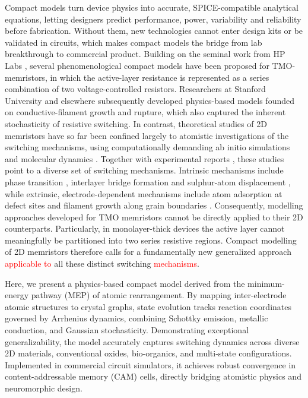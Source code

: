 \documentclass[aip,apl,reprint,floatfix]{revtex4-2}
\newcommand{\changed}[1]{\textcolor{red}{#1}}
\begin{document}
Compact models turn device physics into accurate, SPICE-compatible analytical equations, letting designers predict performance, power, variability and reliability before fabrication. Without them, new technologies cannot enter design kits or be validated in circuits, which makes compact models the bridge from lab breakthrough to commercial product. Building on the seminal work from HP Labs \cite{Strukov2008}, several phenomenological compact models \cite{Pickett2009Switching,Kvatinsky2013TEAM} have been proposed for TMO-memristors, in which the active-layer resistance is represented as a series combination of two voltage-controlled resistors. Researchers at Stanford University \cite{Jiang} and elsewhere \cite{Yu,Guan2012,Huang2013,Li2014} subsequently developed physics-based models founded on conductive-filament growth and rupture, which also captured the inherent stochasticity of resistive switching. In contrast, theoretical studies of 2D memristors have so far been confined largely to atomistic investigations of the switching mechanisms, using computationally demanding ab initio simulations and molecular dynamics \cite{Mitra2024Atomistic}. Together with experimental reports \cite{atomrister,zhang2019electric}, these studies point to a diverse set of switching mechanisms. Intrinsic mechanisms include phase transition \cite{zhang2019electric}, interlayer bridge formation \cite{Ducry2022} and sulphur-atom displacement \cite{Mitra2021}, while extrinsic, electrode-dependent mechanisms include atom adsorption at defect sites \cite{Hus2021,Ge2018} and filament growth along grain boundaries \cite{Sangwan2015}. Consequently, modelling approaches developed for TMO memristors cannot be directly applied to their 2D counterparts. Particularly, in monolayer-thick devices \cite{Rajput2024DefectEngineered} the active layer cannot meaningfully be partitioned into two series resistive regions. Compact modelling of 2D memristors therefore calls for a fundamentally new generalized approach \changed{applicable to} all these distinct switching \changed{mechanisms}. 

Here, we present a physics-based compact model derived from the minimum-energy pathway (MEP) of atomic rearrangement. By mapping inter-electrode atomic structures to crystal graphs, state evolution tracks reaction coordinates governed by Arrhenius dynamics, combining Schottky emission, metallic conduction, and Gaussian stochasticity. Demonstrating exceptional generalizability, the model accurately captures switching dynamics across diverse 2D materials, conventional oxides, bio-organics, and multi-state configurations. Implemented in commercial circuit simulators, it achieves robust convergence in content-addressable memory (CAM) cells, directly bridging atomistic physics and neuromorphic design.
\end{document}
